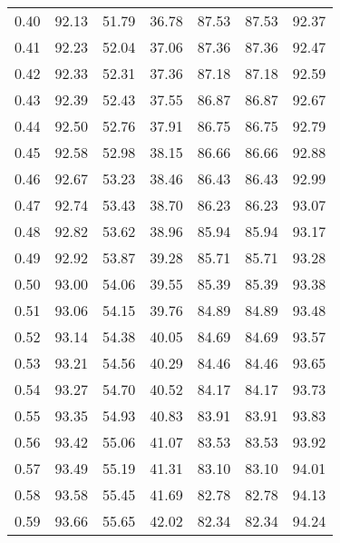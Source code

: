 \begin{tabular}{|c|c|c|c|c|c|c|}
      0.40 &     92.13 &     51.79 &      36.78 &   87.53 &      87.53 &         92.37 \\
      0.41 &     92.23 &     52.04 &      37.06 &   87.36 &      87.36 &         92.47 \\
      0.42 &     92.33 &     52.31 &      37.36 &   87.18 &      87.18 &         92.59 \\
      0.43 &     92.39 &     52.43 &      37.55 &   86.87 &      86.87 &         92.67 \\
      0.44 &     92.50 &     52.76 &      37.91 &   86.75 &      86.75 &         92.79 \\
      0.45 &     92.58 &     52.98 &      38.15 &   86.66 &      86.66 &         92.88 \\
      0.46 &     92.67 &     53.23 &      38.46 &   86.43 &      86.43 &         92.99 \\
      0.47 &     92.74 &     53.43 &      38.70 &   86.23 &      86.23 &         93.07 \\
      0.48 &     92.82 &     53.62 &      38.96 &   85.94 &      85.94 &         93.17 \\
      0.49 &     92.92 &     53.87 &      39.28 &   85.71 &      85.71 &         93.28 \\
      0.50 &     93.00 &     54.06 &      39.55 &   85.39 &      85.39 &         93.38 \\
      0.51 &     93.06 &     54.15 &      39.76 &   84.89 &      84.89 &         93.48 \\
      0.52 &     93.14 &     54.38 &      40.05 &   84.69 &      84.69 &         93.57 \\
      0.53 &     93.21 &     54.56 &      40.29 &   84.46 &      84.46 &         93.65 \\
      0.54 &     93.27 &     54.70 &      40.52 &   84.17 &      84.17 &         93.73 \\
      0.55 &     93.35 &     54.93 &      40.83 &   83.91 &      83.91 &         93.83 \\
      0.56 &     93.42 &     55.06 &      41.07 &   83.53 &      83.53 &         93.92 \\
      0.57 &     93.49 &     55.19 &      41.31 &   83.10 &      83.10 &         94.01 \\
      0.58 &     93.58 &     55.45 &      41.69 &   82.78 &      82.78 &         94.13 \\
      0.59 &     93.66 &     55.65 &      42.02 &   82.34 &      82.34 &         94.24 \\

\end{tabular}
